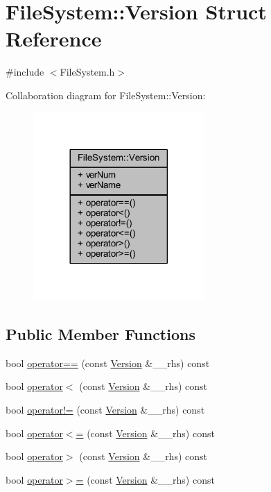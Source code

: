 \hypertarget{struct_file_system_1_1_version}{}\section{File\+System\+:\+:Version Struct Reference}
\label{struct_file_system_1_1_version}


{\ttfamily \#include $<$File\+System.\+h$>$}



Collaboration diagram for File\+System\+:\+:Version\+:
\nopagebreak
\begin{figure}[H]
\begin{center}
\leavevmode
\includegraphics[width=185pt]{struct_file_system_1_1_version__coll__graph}
\end{center}
\end{figure}
\subsection*{Public Member Functions}
\begin{DoxyCompactItemize}
\item 
bool \hyperlink{struct_file_system_1_1_version_a32832303faeaffbda3e7872743a852e6}{operator==} (const \hyperlink{struct_file_system_1_1_version}{Version} \&\+\_\+\+\_\+rhs) const 
\item 
bool \hyperlink{struct_file_system_1_1_version_a9a44e56a52173f7ab4d37d4a82d72aa1}{operator$<$} (const \hyperlink{struct_file_system_1_1_version}{Version} \&\+\_\+\+\_\+rhs) const 
\item 
bool \hyperlink{struct_file_system_1_1_version_a736ea241f3c14654d6c8f4483516f2c9}{operator!=} (const \hyperlink{struct_file_system_1_1_version}{Version} \&\+\_\+\+\_\+rhs) const 
\item 
bool \hyperlink{struct_file_system_1_1_version_a09a411f27ec8c250387ad898b7d37857}{operator$<$=} (const \hyperlink{struct_file_system_1_1_version}{Version} \&\+\_\+\+\_\+rhs) const 
\item 
bool \hyperlink{struct_file_system_1_1_version_a364094d081cad8f20e76a32b7b82ebcb}{operator$>$} (const \hyperlink{struct_file_system_1_1_version}{Version} \&\+\_\+\+\_\+rhs) const 
\item 
bool \hyperlink{struct_file_system_1_1_version_a6296852fc8eac255bcc23c4f586cb6b1}{operator$>$=} (const \hyperlink{struct_file_system_1_1_version}{Version} \&\+\_\+\+\_\+rhs) const 
\end{DoxyCompactItemize}

